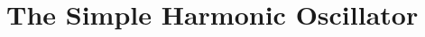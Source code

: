 \documentclass[11pt,twoside,a4paper,english]{book}
\begin{document}



\chapter{The Simple Harmonic Oscillator}\label{chap:SHO}
\end{document}
